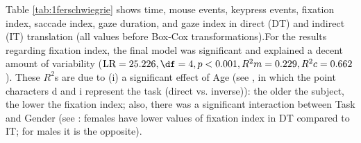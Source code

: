 \documentclass[output=paper]{langscibook}
\begin{document}
\begin{table}
\caption{Time, mouse events, keypress events, fixation index,
saccade index, gaze duration, and gaze index in direct (DT) and indirect (IT) translation. FI: Fixation index; SI: Saccade index; GD: Gaze duration; GI: Gaze index.\label{tab:1ferschwiegrie}}
\end{table}

Table \ref{tab:1ferschwiegrie} shows time, mouse events, keypress events, fixation index, saccade index, gaze duration, and gaze index in direct (DT) and indirect (IT) translation (all values before Box-Cox transformations).\largerpage[2]
For the results regarding fixation index, the final model was significant and explained a decent amount of variability ($\text{LR} = 25.226, \df = 4, p < 0.001, R^2m = 0.229, R^2c = 0.662$). These $R^2$s are due to (i) a significant effect of Age (see , in which the point characters d and i represent the task (direct vs. inverse)): the older the subject, the lower the fixation index; also, there was a significant interaction between Task and Gender (see : females have lower values of fixation index in DT compared to IT; for males it is the opposite).
\end{document}

